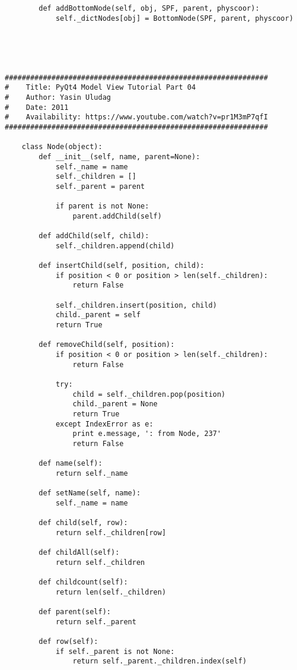 \begin{verbatim}
        def addBottomNode(self, obj, SPF, parent, physcoor):
            self._dictNodes[obj] = BottomNode(SPF, parent, physcoor)





##############################################################    
#    Title: PyQt4 Model View Tutorial Part 04
#    Author: Yasin Uludag
#    Date: 2011
#    Availability: https://www.youtube.com/watch?v=pr1M3mP7qfI
##############################################################

    class Node(object):
        def __init__(self, name, parent=None):
            self._name = name
            self._children = []
            self._parent = parent
    
            if parent is not None:
                parent.addChild(self)
    
        def addChild(self, child):
            self._children.append(child)
    
        def insertChild(self, position, child):
            if position < 0 or position > len(self._children):
                return False
    
            self._children.insert(position, child)
            child._parent = self
            return True
    
        def removeChild(self, position):
            if position < 0 or position > len(self._children):
                return False
    
            try:
                child = self._children.pop(position)
                child._parent = None
                return True
            except IndexError as e:
                print e.message, ': from Node, 237'
                return False
    
        def name(self):
            return self._name
    
        def setName(self, name):
            self._name = name
    
        def child(self, row):
            return self._children[row]
    
        def childAll(self):
            return self._children
    
        def childcount(self):
            return len(self._children)
    
        def parent(self):
            return self._parent
    
        def row(self):
            if self._parent is not None:
                return self._parent._children.index(self)
    

\end{verbatim}

